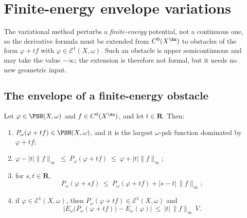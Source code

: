 \section{Finite-energy envelope variations}
\label{sec:ch27-e1-variations}

The variational method perturbs a \emph{finite-energy} potential, not a
continuous one, so the derivative formula must be extended from
\(C^0(X^{\An})\) to obstacles of the form \(\varphi+tf\) with
\(\varphi\in\mathcal E^1(X,\omega)\).  Such an obstacle is upper
semicontinuous and may take the value \(-\infty\); the extension is
therefore not formal, but it needs no new geometric input.

\subsection{The envelope of a finite-energy obstacle}
\label{sec:ch27-e1-envelope}

\begin{lemma}
\label{lem:ch27-e1-envelope-calculus}
Let \(\varphi\in\PSH(X,\omega)\) and \(f\in C^0(X^{\An})\), and let
\(t\in\mathbf R\).  Then:
\begin{enumerate}
\item \(P_\omega(\varphi+tf)\in\PSH(X,\omega)\), and it is the largest
\(\omega\)-psh function dominated by \(\varphi+tf\);
\item \(\varphi-|t|\lVert f\rVert_\infty\ \leq\ P_\omega(\varphi+tf)
\ \leq\ \varphi+|t|\lVert f\rVert_\infty\);
\item for \(s,t\in\mathbf R\),
\begin{equation}\label{eq:ch27-e1-contraction}
 P_\omega(\varphi+sf)\ \leq\ P_\omega(\varphi+tf)
   +|s-t|\,\lVert f\rVert_\infty ;
\end{equation}
\item if \(\varphi\in\mathcal E^1(X,\omega)\), then
\(P_\omega(\varphi+tf)\in\mathcal E^1(X,\omega)\) and
\begin{equation}\label{eq:ch27-e1-energy-lipschitz}
 \bigl|E_\omega\bigl(P_\omega(\varphi+tf)\bigr)-E_\omega(\varphi)\bigr|
 \ \leq\ |t|\,\lVert f\rVert_\infty\,V .
\end{equation}
\end{enumerate}
\end{lemma}

